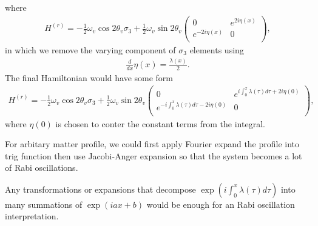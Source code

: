 \documentclass[letterpaper,12pt,english]{sphinxmanual}
\begin{document}
where
\begin{equation*}
\begin{split}H^{(r)} = - \frac{1}{2}\omega_v \cos 2\theta_v \sigma_3 + \frac{1}{2} \omega_v \sin 2\theta_v \begin{pmatrix}
0 & e^{2i\eta(x)} \\
e^{-2i\eta(x)} & 0 \\
\end{pmatrix},\end{split}
\end{equation*}
in which we remove the varying component of \(\sigma_3\) elements using
\begin{equation*}
\begin{split}\frac{d}{dx}\eta(x) = \frac{\lambda(x)}{2}.\end{split}
\end{equation*}
The final Hamiltonian would have some form
\begin{equation*}
\begin{split}H^{(r)} = - \frac{1}{2}\omega_v \cos 2\theta_v \sigma_3 + \frac{1}{2} \omega_v \sin 2\theta_v \begin{pmatrix}
0 & e^{i\int_0^x \lambda(\tau)d\tau + 2i\eta(0)} \\
e^{-i\int_0^x \lambda(\tau)d\tau - 2i\eta(0)} & 0 \\
\end{pmatrix},\end{split}
\end{equation*}
where \(\eta(0)\) is chosen to conter the constant terms from the integral.

For arbitary matter profile, we could first apply Fourier expand the profile into trig function then use Jacobi-Anger expansion so that the system becomes a lot of Rabi oscillations.

Any transformations or expansions that decompose \(\exp{\left(i\int_0^x \lambda(\tau)d\tau\right)}\) into many summations of \(\exp{\left( i a x + b \right)}\) would be enough for an Rabi oscillation interpretation.
\end{document}
